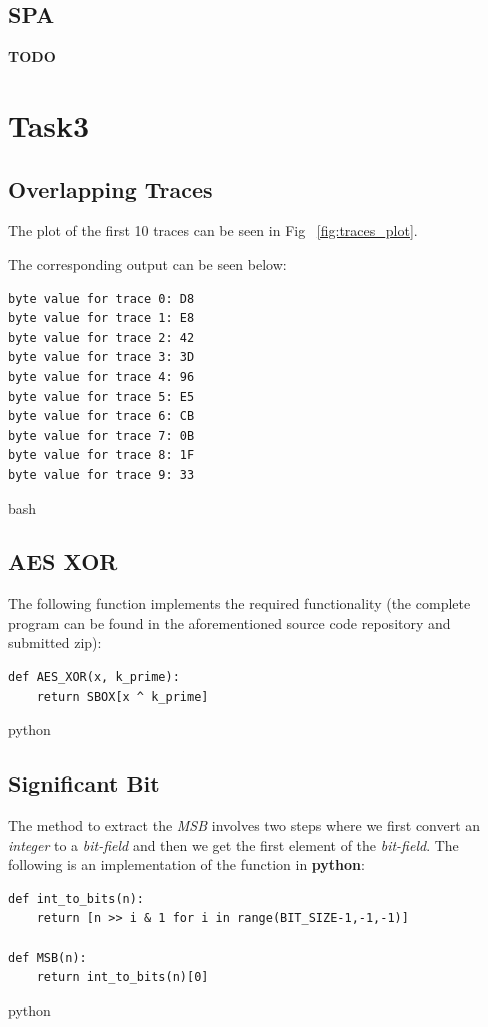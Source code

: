 \documentclass[1p,16pt]{elsarticle}
\begin{document}
\subsection{SPA}%
\label{sub:spa}
\textbf{TODO}

\section{Task3}
\label{Task3}

\subsection{Overlapping Traces}%
\label{sub:overlapping_traces}

The plot of the first 10 traces can be seen in Fig ~\ref{fig:traces_plot}.
\par
The corresponding output can be seen below:
\begin{verbatim}
byte value for trace 0: D8
byte value for trace 1: E8
byte value for trace 2: 42
byte value for trace 3: 3D
byte value for trace 4: 96
byte value for trace 5: E5
byte value for trace 6: CB
byte value for trace 7: 0B
byte value for trace 8: 1F
byte value for trace 9: 33
\end{verbatim}{bash}

\subsection{AES XOR}%
\label{ssub:aes_xor}
The following function implements the required functionality (the complete program can be found in the aforementioned source code repository and submitted zip):

\begin{verbatim}
def AES_XOR(x, k_prime):
    return SBOX[x ^ k_prime]
\end{verbatim}{python}

\subsection{Significant Bit}%
\label{sub:significant_bit}
The method to extract the \textit{MSB} involves two steps where we first convert an \textit{integer}
to a \textit{bit-field} and then we get the first element of the \textit{bit-field}.
The following is an implementation of the function in \textbf{python}:
\begin{verbatim}
def int_to_bits(n):
    return [n >> i & 1 for i in range(BIT_SIZE-1,-1,-1)]

def MSB(n):
    return int_to_bits(n)[0]
\end{verbatim}{python}
\end{document}
